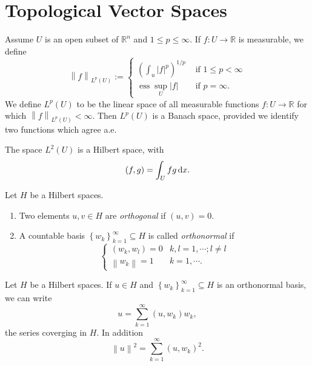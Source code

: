 

\section{Topological Vector Spaces}
\label{section-topological-vector-spaces}
\begin{example}
  \label{example-Lp-spaces}
  Assume \( U \) is an open subset of \( \mathbb{R}^n \) and \( 1 \leq p \leq \infty \).
  If \( f: U \to \mathbb{R} \) is measurable, we define
  \[
    \left\lVert f \right\rVert_{L^p(U)} :=
    \begin{cases}
      \left( \int_u \left\lvert f \right\rvert^p \right)^{1 / p} & \text{ if } 1 \leq p < \infty \\
      \operatorname{ess} \sup_U \left\lvert f \right\rvert       & \text{ if } p = \infty.
    \end{cases}
  \]
  We define \( L^p(U) \) to be the linear space of all measurable functions \( f: U \to \mathbb{R} \) for which \( \left\lVert f \right\rVert_{L^p(U)} < \infty \).
  Then \( L^p(U) \) is a Banach space, provided we identify two functions which agree a.e.
\end{example}

\begin{example}
  \label{example-L2-as-Hilbert-space}
  The space \( L^2(U) \) is a Hilbert space, with
  \[
    (f, g) = \int_U fg \mathop{}\!\mathrm{d} x.
  \]
\end{example}

\begin{definition}
  Let \( H \) be a Hilbert spaces.
  \begin{enumerate}
    \item Two elements \( u, v \in H \) are \emph{orthogonal} if \( (u, v) = 0 \).
    \item A countable basis \( \left\lbrace w_k \right\rbrace^{\infty}_{k = 1} \subseteq H \) is called \emph{orthonormal} if
          \[
            \begin{cases}
              (w_k, w_l) = 0                   & k, l = 1, \cdots; l \neq l \\
              \left\lVert w_k \right\rVert = 1 & k = 1, \cdots.
            \end{cases}
          \]
  \end{enumerate}
\end{definition}
Let \( H \) be a Hilbert spaces.
If \( u \in H \) and \( \left\lbrace w_k \right\rbrace_{k = 1}^\infty \subseteq H \) is an orthonormal basis, we can write
\[
  u = \sum_{k = 1}^{\infty}(u, w_k)w_k,
\]
the series coverging in \( H \).
In addition
\[
  \left\lVert u \right\rVert^2 = \sum_{k = 1}^{\infty}(u, w_k)^2.
\]


